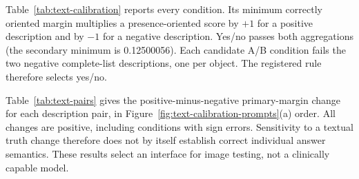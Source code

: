 \clearpage
Table~\ref{tab:text-calibration} reports every condition. Its minimum
correctly oriented margin multiplies a presence-oriented score by $+1$
for a positive description and by $-1$ for a negative description.
Yes/no passes both aggregations (the secondary minimum is 0.12500056).
Each candidate A/B condition fails the two negative complete-list
descriptions, one per object. The registered rule therefore selects yes/no.

\begin{table}[H]
\centering
\caption{Answer-sign accuracy on constructed descriptions.}
\label{tab:text-calibration}
\end{table}

Table~\ref{tab:text-pairs} gives the positive-minus-negative primary-margin
change for each description pair, in Figure~\ref{fig:text-calibration-prompts}(a)
order. All changes are positive, including conditions with sign errors.
Sensitivity to a textual truth change therefore does not by itself
establish correct individual answer semantics. These results select an
interface for image testing, not a clinically capable model.


